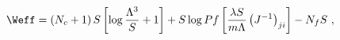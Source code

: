 \begin{equation}
\Weff= \left(N_c+1\right)S \left[\log{\frac{\Lambda^3}{S}}+1 \right]
+ S\log{Pf\left[\frac{\lambda S}{m \Lambda} \left(J^{-1} \right)_{ji}\right]}
-N_f S ~,
\end{equation}

